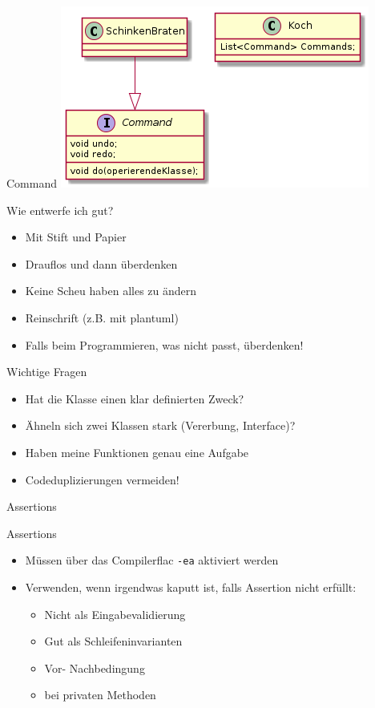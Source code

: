 \documentclass[18pt]{beamer}
\begin{document}
\begin{frame}{Command}
 \includegraphics[scale=0.6]{command}
\end{frame}

\begin{frame}{Wie entwerfe ich gut?}
\pause
 \begin{itemize}
  \item Mit Stift und Papier
  \item Drauflos und dann überdenken
  \item Keine Scheu haben alles zu ändern
  \item Reinschrift (z.B. mit plantuml)
  \item Falls beim Programmieren, was nicht passt, überdenken!
 \end{itemize}

\end{frame}


\begin{frame}{Wichtige Fragen}
 \begin{itemize}
  \item Hat die Klasse einen klar definierten Zweck?
  \item Ähneln sich zwei Klassen stark (Vererbung, Interface)?
  \item Haben meine Funktionen genau eine Aufgabe
  \item Codeduplizierungen vermeiden!
 \end{itemize}

\end{frame}


\begin{section}{Assertions} 
\begin{frame}[fragile]{Assertions}
 \pause
 \begin{itemize}
  \item Müssen über das Compilerflac \verb|-ea| aktiviert werden
  \item Verwenden, wenn irgendwas kaputt ist, falls Assertion nicht erfüllt:
  \begin{itemize}
   \item Nicht als Eingabevalidierung
   \item Gut als Schleifeninvarianten
   \item Vor- Nachbedingung
   \item bei privaten Methoden
  \end{itemize}
 \end{itemize}

\end{frame}
\end{section}
\end{document}

